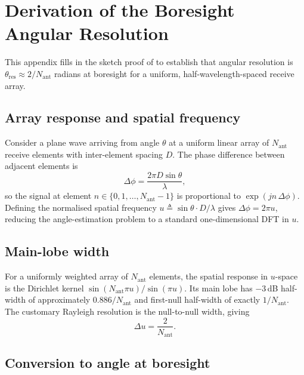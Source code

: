 \documentclass[letterpaper,11pt,leqno]{article}
\newcommand{\bib}{paper.bib}
\begin{document}

\appendix

\section{Derivation of the Boresight Angular Resolution}\label{a:angres}

This appendix fills in the sketch proof of  to establish that angular resolution is $\theta_{\mathrm{res}}\approx 2/N_{\mathrm{ant}}$ radians at boresight for a uniform, half-wavelength-spaced receive array.

\subsection{Array response and spatial frequency}

Consider a plane wave arriving from angle $\theta$ at a uniform linear array of $N_{\mathrm{ant}}$ receive elements with inter-element spacing $D$. The phase difference between adjacent elements is
\begin{equation}\label{e:phaseprog}
\Delta\phi = \frac{2\pi D\sin\theta}{\lambda},
\end{equation}
so the signal at element $n\in\{0,1,\ldots,N_{\mathrm{ant}}-1\}$ is proportional to $\exp(j n\,\Delta\phi)$. Defining the normalised spatial frequency $u\triangleq \sin\theta\cdot D/\lambda$ gives $\Delta\phi = 2\pi u$, reducing the angle-estimation problem to a standard one-dimensional DFT in $u$.

\subsection{Main-lobe width}

For a uniformly weighted array of $N_{\mathrm{ant}}$ elements, the spatial response in $u$-space is the Dirichlet kernel $\sin(N_{\mathrm{ant}}\pi u)/\sin(\pi u)$. Its main lobe has $-3$\,dB half-width of approximately $0.886/N_{\mathrm{ant}}$ and first-null half-width of exactly $1/N_{\mathrm{ant}}$. The customary Rayleigh resolution is the null-to-null width, giving
\begin{equation}\label{e:ures}
\Delta u = \frac{2}{N_{\mathrm{ant}}}.
\end{equation}

\subsection{Conversion to angle at boresight}
\end{document}
